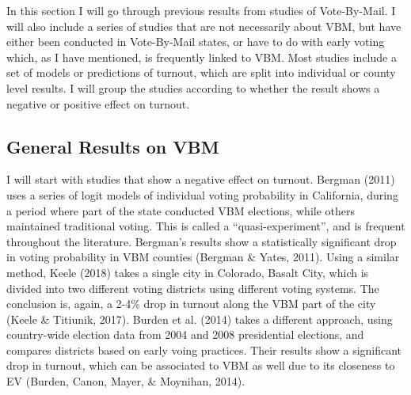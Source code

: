 \documentclass[12pt,twoside]{reedthesis}
\begin{document}
  In this section I will go through previous results from studies of
  Vote-By-Mail. I will also include a series of studies that are not
  necessarily about VBM, but have either been conducted in Vote-By-Mail
  states, or have to do with early voting which, as I have mentioned, is
  frequently linked to VBM. Most studies include a set of models or
  predictions of turnout, which are split into individual or county level
  results. I will group the studies according to whether the result shows
  a negative or positive effect on turnout.
  
  \subsection{General Results on VBM}\label{general-results-on-vbm}
  
  I will start with studies that show a negative effect on turnout.
  Bergman (2011) uses a series of logit models of individual voting
  probability in California, during a period where part of the state
  conducted VBM elections, while others maintained traditional voting.
  This is called a ``quasi-experiment'', and is frequent throughout the
  literature. Bergman's results show a statistically significant drop in
  voting probability in VBM counties (Bergman \& Yates, 2011). Using a
  similar method, Keele (2018) takes a single city in Colorado, Basalt
  City, which is divided into two different voting districts using
  different voting systems. The conclusion is, again, a 2-4\% drop in
  turnout along the VBM part of the city (Keele \& Titiunik, 2017). Burden
  et al. (2014) takes a different approach, using country-wide election
  data from 2004 and 2008 presidential elections, and compares districts
  based on early voing practices. Their results show a significant drop in
  turnout, which can be associated to VBM as well due to its closeness to
  EV (Burden, Canon, Mayer, \& Moynihan, 2014).
  
\end{document}

